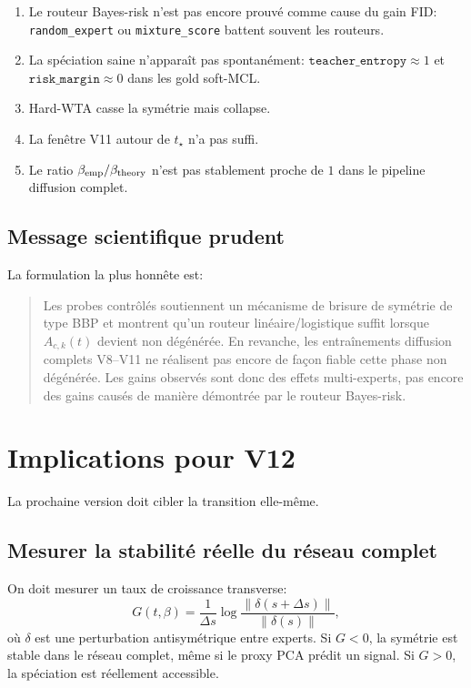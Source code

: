 \documentclass[11pt,a4paper]{article}
\newcommand{\1}{\mathbf{1}}
\begin{document}
\begin{enumerate}[leftmargin=2em]
\item Le routeur Bayes-risk n'est pas encore prouvé comme cause du gain FID: \texttt{random\_expert} ou \texttt{mixture\_score} battent souvent les routeurs.
\item La spéciation saine n'apparaît pas spontanément: $\texttt{teacher\_entropy}\approx1$ et $\texttt{risk\_margin}\approx0$ dans les gold soft-MCL.
\item Hard-WTA casse la symétrie mais collapse.
\item La fenêtre V11 autour de $t_\star$ n'a pas suffi.
\item Le ratio $\beta_{\rm emp}/\beta_{\rm theory}$ n'est pas stablement proche de $1$ dans le pipeline diffusion complet.
\end{enumerate}

\subsection{Message scientifique prudent}

La formulation la plus honnête est:
\begin{quote}
Les probes contrôlés soutiennent un mécanisme de brisure de symétrie de type BBP et montrent qu'un routeur linéaire/logistique suffit lorsque $A_{c,k}(t)$ devient non dégénérée. En revanche, les entraînements diffusion complets V8--V11 ne réalisent pas encore de façon fiable cette phase non dégénérée. Les gains observés sont donc des effets multi-experts, pas encore des gains causés de manière démontrée par le routeur Bayes-risk.
\end{quote}

\section{Implications pour V12}

La prochaine version doit cibler la transition elle-même.

\subsection{Mesurer la stabilité réelle du réseau complet}

On doit mesurer un taux de croissance transverse:
\begin{equation}
G(t,\beta)=\frac1{\Delta s}\log\frac{\|\delta(s+\Delta s)\|}{\|\delta(s)\|},
\end{equation}
où $\delta$ est une perturbation antisymétrique entre experts. Si $G<0$, la symétrie est stable dans le réseau complet, même si le proxy PCA prédit un signal. Si $G>0$, la spéciation est réellement accessible.
\end{document}
